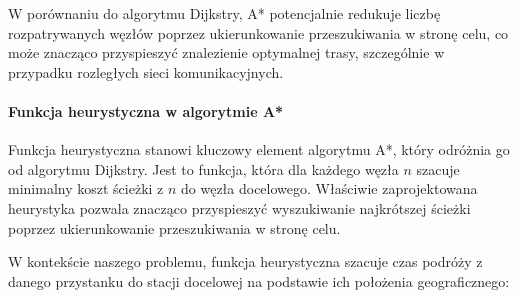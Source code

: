 \documentclass[12pt,a4paper]{article}
\begin{document}
W porównaniu do algorytmu Dijkstry, A* potencjalnie redukuje liczbę rozpatrywanych węzłów poprzez ukierunkowanie przeszukiwania w stronę celu, co może znacząco przyspieszyć znalezienie optymalnej trasy, szczególnie w przypadku rozległych sieci komunikacyjnych.

\paragraph{Funkcja heurystyczna w algorytmie A*}
Funkcja heurystyczna stanowi kluczowy element algorytmu A*, który odróżnia go od algorytmu Dijkstry. Jest to funkcja, która dla każdego węzła $n$ szacuje minimalny koszt ścieżki z $n$ do węzła docelowego. Właściwie zaprojektowana heurystyka pozwala znacząco przyspieszyć wyszukiwanie najkrótszej ścieżki poprzez ukierunkowanie przeszukiwania w stronę celu.

W kontekście naszego problemu, funkcja heurystyczna szacuje czas podróży z danego przystanku do stacji docelowej na podstawie ich położenia geograficznego:
\end{document}
